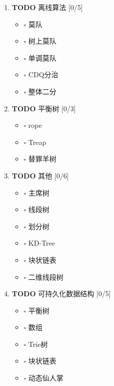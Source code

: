 \documentclass[11pt]{article}
\begin{document}
\begin{enumerate}
\item {\bfseries\sffamily TODO} 离线算法 [0/5]
\label{sec-1-1-7-1}

\begin{itemize}
\item $\square$ 莫队
\item $\square$ 树上莫队
\item $\square$ 单调莫队
\item $\square$ CDQ分治
\item $\square$ 整体二分
\end{itemize}

\item {\bfseries\sffamily TODO} 平衡树 [0/3]
\label{sec-1-1-7-2}

\begin{itemize}
\item $\square$ rope
\item $\square$ Treap
\item $\square$ 替罪羊树
\end{itemize}

\item {\bfseries\sffamily TODO} 其他 [0/6]
\label{sec-1-1-7-3}

\begin{itemize}
\item $\square$ 主席树
\item $\square$ 线段树
\item $\square$ 划分树
\item $\square$ KD-Tree
\item $\square$ 块状链表
\item $\square$ 二维线段树
\end{itemize}

\item {\bfseries\sffamily TODO} 可持久化数据结构 [0/5]
\label{sec-1-1-7-4}

\begin{itemize}
\item $\square$ 平衡树
\item $\square$ 数组
\item $\square$ Trie树
\item $\square$ 块状链表
\item $\square$ 动态仙人掌
\end{itemize}
\end{enumerate}
\end{document}
